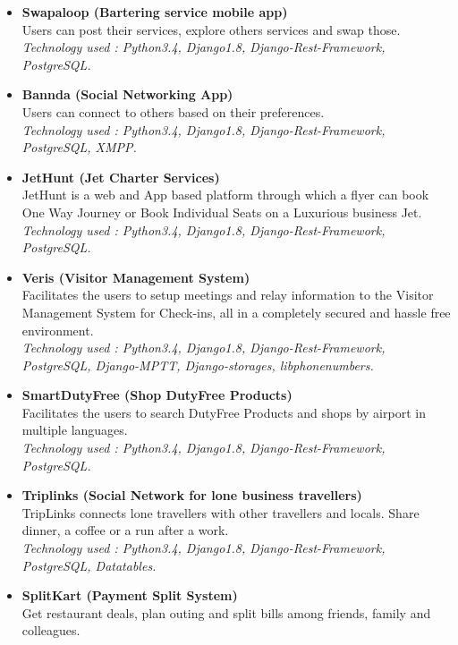 \documentclass[11pt]{article}
\begin{document}
\begin{itemize}
 \item \textbf{Swapaloop (Bartering service mobile app)}
    \\ Users can post their services, explore others services and swap those.
    \\ \textit{Technology used : Python3.4, Django1.8, Django-Rest-Framework, PostgreSQL.}
 \item \textbf{Bannda (Social Networking App)}
    \\ Users can connect to others based on their preferences.
    \\ \textit{Technology used : Python3.4, Django1.8, Django-Rest-Framework, PostgreSQL, XMPP.}
 \item \textbf{JetHunt (Jet Charter Services)}
    \\ JetHunt is a web and App based platform through which a flyer can book One Way Journey or Book Individual Seats on a Luxurious business Jet.
    \\ \textit{Technology used : Python3.4, Django1.8, Django-Rest-Framework, PostgreSQL.}
 \item \textbf{Veris (Visitor Management System)}
    \\ Facilitates the users to setup meetings and relay information to the Visitor Management System for Check-ins, all in a completely secured and hassle free environment.
    \\ \textit{Technology used : Python3.4, Django1.8, Django-Rest-Framework, PostgreSQL, Django-MPTT, Django-storages, libphonenumbers.}
 \item \textbf{SmartDutyFree (Shop DutyFree Products)}
    \\ Facilitates the users to search DutyFree Products and shops by airport in multiple languages.
    \\ \textit{Technology used : Python3.4, Django1.8, Django-Rest-Framework, PostgreSQL.}
 \item \textbf{Triplinks (Social Network for lone business travellers)}
    \\ TripLinks connects lone travellers with other travellers and locals. Share dinner, a coffee or a run after a work.
    \\ \textit{Technology used : Python3.4, Django1.8, Django-Rest-Framework, PostgreSQL, Datatables.}
 \item \textbf{SplitKart (Payment Split System)}
    \\ Get restaurant deals, plan outing and split bills among friends, family and colleagues.

\end{itemize}
\end{document}
